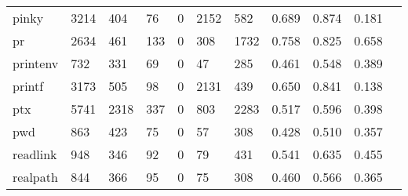 \begin{longtable}{lp{1.10cm}p{1.10cm}p{1.10cm}p{1.10cm}p{1.10cm}p{1.10cm}p{1.10cm}p{1.10cm}p{1.10cm}p{1.10cm}}
pinky     &                   3214 &                                404 &                                76 &                                0 &                              2152 &                             582 &                          0.689 &                                 0.874 &                               0.181 \\
pr        &                   2634 &                                461 &                               133 &                                0 &                               308 &                            1732 &                          0.758 &                                 0.825 &                               0.658 \\
printenv  &                    732 &                                331 &                                69 &                                0 &                                47 &                             285 &                          0.461 &                                 0.548 &                               0.389 \\
printf    &                   3173 &                                505 &                                98 &                                0 &                              2131 &                             439 &                          0.650 &                                 0.841 &                               0.138 \\
ptx       &                   5741 &                               2318 &                               337 &                                0 &                               803 &                            2283 &                          0.517 &                                 0.596 &                               0.398 \\
pwd       &                    863 &                                423 &                                75 &                                0 &                                57 &                             308 &                          0.428 &                                 0.510 &                               0.357 \\
readlink  &                    948 &                                346 &                                92 &                                0 &                                79 &                             431 &                          0.541 &                                 0.635 &                               0.455 \\
realpath  &                    844 &                                366 &                                95 &                                0 &                                75 &                             308 &                          0.460 &                                 0.566 &                               0.365 \\

\end{longtable}
